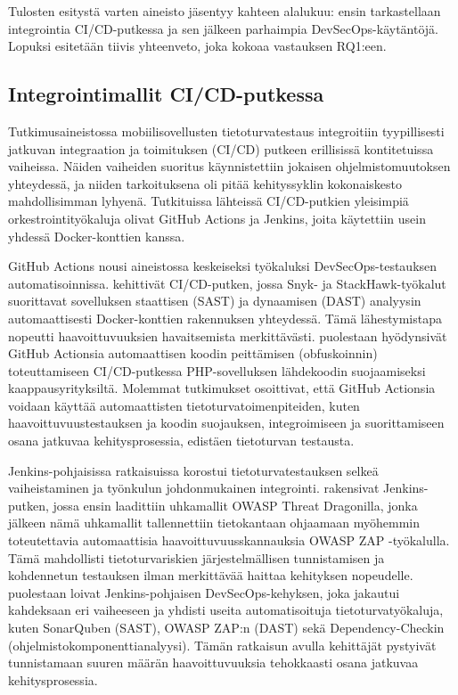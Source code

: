 \documentclass[bscthesis,finnish,oneside,biblatex]{uefcsthesis}
\begin{document}
Tulosten esitystä varten aineisto jäsentyy kahteen alalukuu: ensin tarkastellaan integrointia CI/CD-putkessa ja sen jälkeen parhaimpia DevSecOps-käytäntöjä. Lopuksi esitetään tiivis yhteenveto, joka kokoaa vastauksen RQ1:een.

\subsection{Integrointimallit CI/CD-putkessa}

Tutkimusaineistossa mobiilisovellusten tietoturvatestaus integroitiin tyypillisesti jatkuvan integraation ja toimituksen (CI/CD) putkeen erillisissä kontitetuissa vaiheissa. Näiden vaiheiden suoritus käynnistettiin jokaisen ohjelmistomuutoksen yhteydessä, ja niiden tarkoituksena oli pitää kehityssyklin kokonaiskesto mahdollisimman lyhyenä. Tutkituissa lähteissä CI/CD-putkien yleisimpiä orkestrointityökaluja olivat GitHub Actions ja Jenkins, joita käytettiin usein yhdessä Docker-konttien kanssa.

GitHub Actions nousi aineistossa keskeiseksi työkaluksi DevSecOps-testauksen automatisoinnissa. \cite{marandi2023_ias} kehittivät CI/CD-putken, jossa Snyk- ja StackHawk-työkalut suorittavat sovelluksen staattisen (SAST) ja dynaamisen (DAST) analyysin automaattisesti Docker-konttien rakennuksen yhteydessä. Tämä lähestymistapa nopeutti haavoittuvuuksien havaitsemista merkittävästi. \cite{afifah2024_coi} puolestaan hyödynsivät GitHub Actionsia automaattisen koodin peittämisen (obfuskoinnin) toteuttamiseen CI/CD-putkessa PHP-sovelluksen lähdekoodin suojaamiseksi kaappausyrityksiltä. Molemmat tutkimukset osoittivat, että GitHub Actionsia voidaan käyttää automaattisten tietoturvatoimenpiteiden, kuten haavoittuvuustestauksen ja koodin suojauksen, integroimiseen ja suorittamiseen osana jatkuvaa kehitysprosessia, edistäen tietoturvan testausta.

Jenkins-pohjaisissa ratkaisuissa korostui tietoturvatestauksen selkeä vaiheistaminen ja työnkulun johdonmukainen integrointi. \cite{nikolov2024_fit} rakensivat Jenkins-putken, jossa ensin laadittiin uhkamallit OWASP Threat Dragonilla, jonka jälkeen nämä uhkamallit tallennettiin tietokantaan ohjaamaan myöhemmin toteutettavia automaattisia haavoittuvuusskannauksia OWASP ZAP -työkalulla. Tämä mahdollisti tietoturvariskien järjestelmällisen tunnistamisen ja kohdennetun testauksen ilman merkittävää haittaa kehityksen nopeudelle. \cite{feio2024_empirical} puolestaan loivat Jenkins-pohjaisen DevSecOps-kehyksen, joka jakautui kahdeksaan eri vaiheeseen ja yhdisti useita automatisoituja tietoturvatyökaluja, kuten SonarQuben (SAST), OWASP ZAP:n (DAST) sekä Dependency-Checkin (ohjelmistokomponenttianalyysi). Tämän ratkaisun avulla kehittäjät pystyivät tunnistamaan suuren määrän haavoittuvuuksia tehokkaasti osana jatkuvaa kehitysprosessia.
\end{document}
